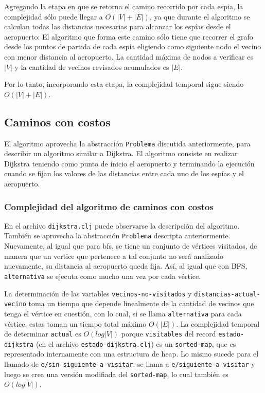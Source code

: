 \documentclass{article}
\begin{document}
Agregando la etapa en que se retorna el camino recorrido por cada espia, la complejidad sólo puede llegar a $O(|V| +|E|)$, ya que durante el algoritmo se calculan todas las distancias necesarias para alcanzar los espías desde el aeropuerto: El algoritmo que forma este camino sólo tiene que recorrer el grafo desde los puntos de partida de cada espía eligiendo como siguiente nodo el vecino con menor distancia al aeropuerto. La cantidad máxima de nodos a verificar es $|V|$ y la cantidad de vecinos revisados acumulados es $|E|$.

Por lo tanto, incorporando esta etapa, la complejidad temporal sigue siendo $O(|V|+|E|)$.

\subsection{Caminos con costos}

El algoritmo aprovecha la abstracción \texttt{Problema} discutida anteriormente, para describir un algoritmo similar a Dijkstra. El algoritmo consiste en realizar Dijkstra teniendo como punto de inicio el aeropuerto y terminando la ejecución cuando se fijan los valores de las distancias entre cada uno de los espías y el aeropuerto.

\subsubsection{Complejidad del algoritmo de caminos con costos}

En el archivo \texttt{dijkstra.clj} puede observarse la descripción del algoritmo. También se aprovecha la abstracción \texttt{Problema} descripta anteriormente. Nuevamente, al igual que para bfs, se tiene un conjunto de vértices visitados, de manera que un vertice que pertenece a tal conjunto no será analizado nuevamente, su distancia al aeropuerto queda fija. Así, al igual que con BFS, \texttt{alternativa} se ejecuta como mucho una vez por cada vértice.

La determinación de las variables \texttt{vecinos-no-visitados} y \texttt{distancias-actual-vecino} toma un tiempo que depende linealmente de la cantidad de vecinos que tenga el vértice en cuestión, con lo cual, si se llama \texttt{alternativa} para cada vértice, estas toman un tiempo total máximo $O(|E|)$. La complejidad temporal de determinar \texttt{actual}  es $O(log |V|)$ porque \texttt{visitables} del record \texttt{estado-dijkstra} (en el archivo \texttt{estado-dijkstra.clj}) es un \texttt{sorted-map}, que es representado internamente con una estructura de heap. Lo mismo sucede para el llamado de \texttt{e/sin-siguiente-a-visitar}: se llama a \texttt{e/siguiente-a-visitar} y luego se crea una versión modifiada del \texttt{sorted-map}, lo cual también es $O(log |V|)$.
\end{document}
